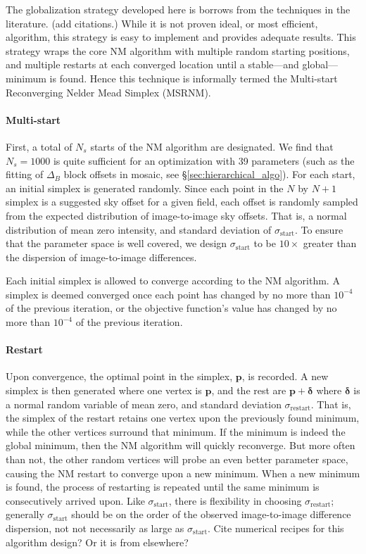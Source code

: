 \documentclass[iop]{emulateapj}
\newcommand{\vect}[1]{\boldsymbol{#1}} %
\newcommand{\todo}[1]{\textcolor{RedOrange}{#1}} %
\newcommand{\Sec}[1]{\S\ref{sec:#1}}  %
\begin{document}
The globalization strategy developed here is borrows from the techniques in the literature.
\todo{(add citations.)}
While it is not proven ideal, or most efficient, algorithm, this strategy is easy to implement and provides adequate results.
This strategy wraps the core NM algorithm with multiple random starting positions, and multiple restarts at each converged location until a stable---and global---minimum is found.
Hence this technique is informally termed the Multi-start Reconverging Nelder Mead Simplex (MSRNM).

\paragraph{Multi-start} First, a total of $N_s$ starts of the NM algorithm are designated.
We find that $N_s=1000$ is quite sufficient for an optimization with 39 parameters (such as the fitting of $\Delta_B$ block offsets in mosaic, see \Sec{hierarchical_algo}).
For each start, an initial simplex is generated randomly.
Since each point in the $N$ by $N+1$ simplex is a suggested sky offset for a given field, each offset is randomly sampled from the expected distribution of image-to-image sky offsets.
That is, a normal distribution of mean zero intensity, and standard deviation of $\sigma_\mathrm{start}$.
To ensure that the parameter space is well covered, we design $\sigma_\mathrm{start}$ to be $10\times$ greater than the dispersion of image-to-image differences.

Each initial simplex is allowed to converge according to the NM algorithm.
A simplex is deemed converged once each point has changed by no more than $10^{-4}$ of the previous iteration, or the objective function's value has changed by no more than $10^{-4}$ of the previous iteration. 

\paragraph{Restart} Upon convergence, the optimal point in the simplex, $\vect{p}$, is recorded.
A new simplex is then generated where one vertex is $\vect{p}$, and the rest are $\vect{p}+\vect{\delta}$ where $\vect{\delta}$ is a normal random variable of mean zero, and standard deviation $\sigma_\mathrm{restart}$.
That is, the simplex of the restart retains one vertex upon the previously found minimum, while the other vertices surround that minimum.
If the minimum is indeed the global minimum, then the NM algorithm will quickly reconverge.
But more often than not, the other random vertices will probe an even better parameter space, causing the NM restart to converge upon a new minimum.
When a new minimum is found, the process of restarting is repeated until the same minimum is consecutively arrived upon.
Like $\sigma_\mathrm{start}$, there is flexibility in choosing $\sigma_\mathrm{restart}$; generally $\sigma_\mathrm{start}$ should be on the order of the observed image-to-image difference dispersion, not not necessarily as large as $\sigma_\mathrm{start}$.
\todo{Cite numerical recipes for this algorithm design? Or it is from elsewhere?}
\end{document}
